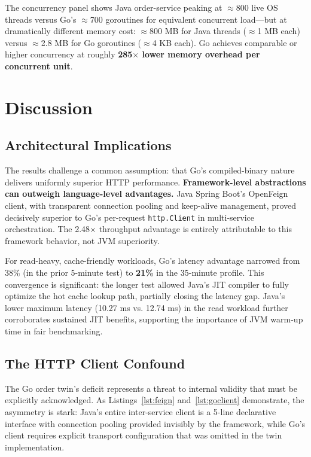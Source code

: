 \documentclass[conference]{IEEEtran}
\begin{document}
The concurrency panel shows Java order-service peaking at $\approx$800 live OS threads versus Go's $\approx$700 goroutines for equivalent concurrent load---but at dramatically different memory cost: $\approx$800 MB for Java threads ($\approx$1 MB each) versus $\approx$2.8 MB for Go goroutines ($\approx$4 KB each). Go achieves comparable or higher concurrency at roughly \textbf{285$\times$ lower memory overhead per concurrent unit}.

\section{Discussion}

\subsection{Architectural Implications}

The results challenge a common assumption: that Go's compiled-binary nature delivers uniformly superior HTTP performance. \textbf{Framework-level abstractions can outweigh language-level advantages.} Java Spring Boot's OpenFeign client, with transparent connection pooling and keep-alive management, proved decisively superior to Go's per-request \texttt{http.Client} in multi-service orchestration. The 2.48$\times$ throughput advantage is entirely attributable to this framework behavior, not JVM superiority.

For read-heavy, cache-friendly workloads, Go's latency advantage narrowed from 38\% (in the prior 5-minute test) to \textbf{21\%} in the 35-minute profile. This convergence is significant: the longer test allowed Java's JIT compiler to fully optimize the hot cache lookup path, partially closing the latency gap. Java's lower maximum latency (10.27 ms vs. 12.74 ms) in the read workload further corroborates sustained JIT benefits, supporting the importance of JVM warm-up time in fair benchmarking.

\subsection{The HTTP Client Confound}

The Go order twin's deficit represents a threat to internal validity that must be explicitly acknowledged. As Listings~\ref{lst:feign} and~\ref{lst:goclient} demonstrate, the asymmetry is stark: Java's entire inter-service client is a 5-line declarative interface with connection pooling provided invisibly by the framework, while Go's client requires explicit transport configuration that was omitted in the twin implementation.
\end{document}
